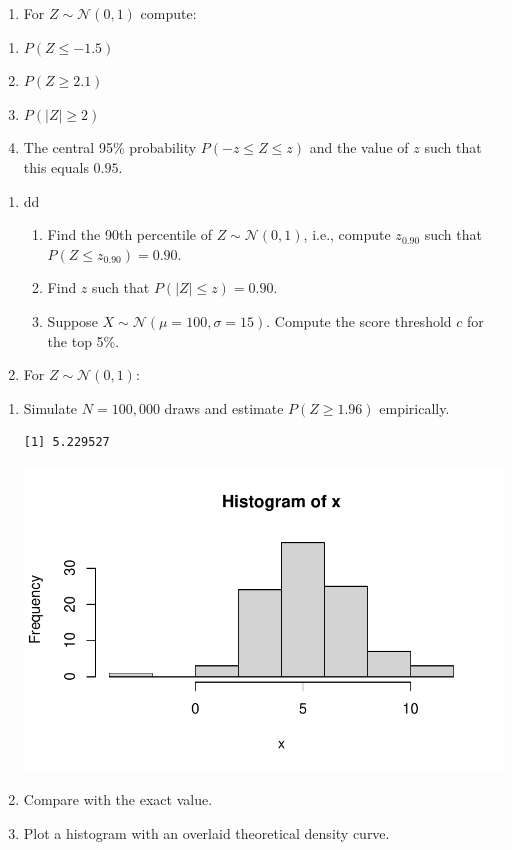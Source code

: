 \documentclass[
  letterpaper,
  DIV=11,
  numbers=noendperiod]{scrartcl}
\providecommand{\tightlist}{%
  \setlength{\itemsep}{0pt}\setlength{\parskip}{0pt}}\usepackage{longtable,booktabs,array}
\begin{document}
\begin{enumerate}
\def\labelenumi{\arabic{enumi}.}
\setcounter{enumi}{6}
\tightlist
\item
  For \(Z \sim \mathcal N(0,1)\) compute:
\end{enumerate}

\begin{enumerate}
\def\labelenumi{(\alph{enumi})}
\item
  \(P(Z \le -1.5)\)
\item
  \(P(Z \ge 2.1)\)
\item
  \(P(|Z| \ge 2)\)
\item
  The central 95\% probability \(P(-z \le Z \le z)\) and the value of
  \(z\) such that this equals \(0.95\).
\end{enumerate}

\begin{enumerate}
\def\labelenumi{\arabic{enumi}.}
\setcounter{enumi}{7}
\item
  dd

  \begin{enumerate}
  \def\labelenumii{(\alph{enumii})}
  \item
    Find the 90th percentile of \(Z \sim \mathcal N(0,1)\), i.e.,
    compute \(z_{0.90}\) such that \(P(Z \le z_{0.90})=0.90\).
  \item
    Find \(z\) such that \(P(|Z| \le z)=0.90\).
  \item
    Suppose \(X \sim \mathcal N(\mu=100, \sigma=15)\). Compute the score
    threshold \(c\) for the top 5\%.
  \end{enumerate}
\item
  For \(Z \sim \mathcal N(0,1)\):
\end{enumerate}

\begin{enumerate}
\def\labelenumi{(\alph{enumi})}
\item
  Simulate \(N=100{,}000\) draws and estimate \(P(Z \ge 1.96)\)
  empirically.

\begin{verbatim}
[1] 5.229527
\end{verbatim}

  \includegraphics{WS1-APE2-a_files/figure-pdf/unnamed-chunk-15-1.pdf}
\item
  Compare with the exact value.
\item
  Plot a histogram with an overlaid theoretical density curve.
\end{enumerate}
\end{document}
